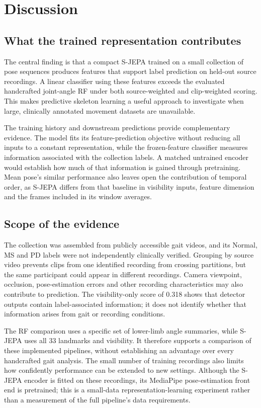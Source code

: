 \section{Discussion}
\subsection{What the trained representation contributes}
The central finding is that a compact S-JEPA trained on a small collection of pose sequences produces features that support label prediction on held-out source recordings. A linear classifier using these features exceeds the evaluated handcrafted joint-angle RF under both source-weighted and clip-weighted scoring. This makes predictive skeleton learning a useful approach to investigate when large, clinically annotated movement datasets are unavailable.

The training history and downstream predictions provide complementary evidence. The model fits its feature-prediction objective without reducing all inputs to a constant representation, while the frozen-feature classifier measures information associated with the collection labels. A matched untrained encoder would establish how much of that information is gained through pretraining. Mean pose's similar performance also leaves open the contribution of temporal order, as S-JEPA differs from that baseline in visibility inputs, feature dimension and the frames included in its window averages.

\subsection{Scope of the evidence}
The collection was assembled from publicly accessible gait videos, and its Normal, MS and PD labels were not independently clinically verified. Grouping by source video prevents clips from one identified recording from crossing partitions, but the same participant could appear in different recordings. Camera viewpoint, occlusion, pose-estimation errors and other recording characteristics may also contribute to prediction. The visibility-only score of 0.318 shows that detector outputs contain label-associated information; it does not identify whether that information arises from gait or recording conditions.

The RF comparison uses a specific set of lower-limb angle summaries, while S-JEPA uses all 33 landmarks and visibility. It therefore supports a comparison of these implemented pipelines, without establishing an advantage over every handcrafted gait analysis. The small number of training recordings also limits how confidently performance can be extended to new settings. Although the S-JEPA encoder is fitted on these recordings, its MediaPipe pose-estimation front end is pretrained; this is a small-data representation-learning experiment rather than a measurement of the full pipeline's data requirements.

